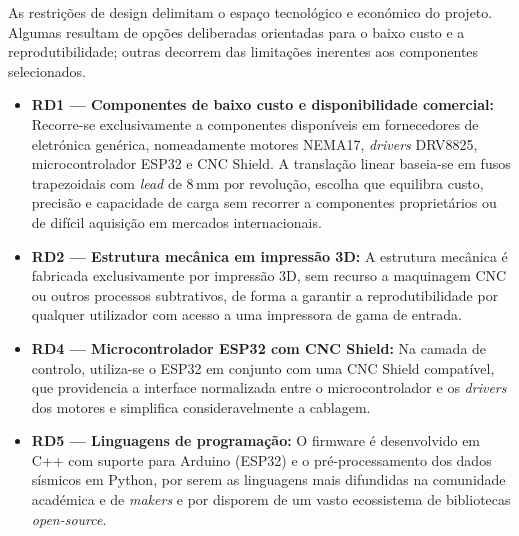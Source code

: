 As restrições de design delimitam o espaço tecnológico e económico do projeto. Algumas resultam de opções deliberadas orientadas para o baixo custo e a reprodutibilidade; outras decorrem das limitações inerentes aos componentes selecionados.

\begin{itemize}
    \item \textbf{RD1 --- Componentes de baixo custo e disponibilidade comercial:} Recorre-se exclusivamente a componentes disponíveis em fornecedores de eletrónica genérica, nomeadamente motores NEMA17, \textit{drivers} DRV8825, microcontrolador ESP32 e CNC Shield. A translação linear baseia-se em fusos trapezoidais com \textit{lead} de 8\,mm por revolução, escolha que equilibra custo, precisão e capacidade de carga sem recorrer a componentes proprietários ou de difícil aquisição em mercados internacionais.

    \item \textbf{RD2 --- Estrutura mecânica em impressão 3D:} A estrutura mecânica é fabricada exclusivamente por impressão 3D, sem recurso a maquinagem CNC ou outros processos subtrativos, de forma a garantir a reprodutibilidade por qualquer utilizador com acesso a uma impressora de gama de entrada.

    \item \textbf{RD4 --- Microcontrolador ESP32 com CNC Shield:} Na camada de controlo, utiliza-se o ESP32 em conjunto com uma CNC Shield compatível, que providencia a interface normalizada entre o microcontrolador e os \textit{drivers} dos motores e simplifica consideravelmente a cablagem.

    \item \textbf{RD5 --- Linguagens de programação:} O firmware é desenvolvido em C++ com suporte para Arduino (ESP32) e o pré-processamento dos dados sísmicos em Python, por serem as linguagens mais difundidas na comunidade académica e de \textit{makers} e por disporem de um vasto ecossistema de bibliotecas \textit{open-source}.
\end{itemize}
